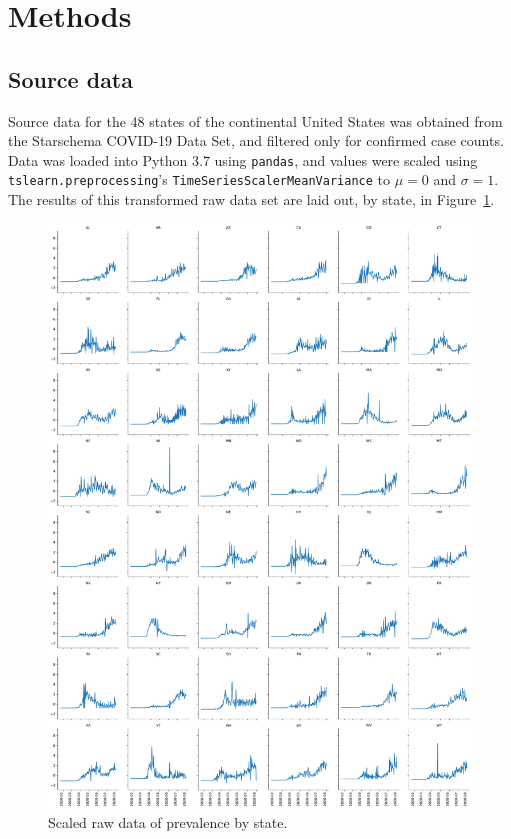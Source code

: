 \documentclass{article}
\begin{document}

\section{Methods} %
\label{sec:methods}

\subsection{Source data} %
\label{sub:source_data}

Source data for the 48 states of the continental United States was obtained from the Starschema COVID-19 Data Set,\cite{foldi_tamas_2020_3969287} and filtered only for confirmed case counts. Data was loaded into Python 3.7 using \texttt{pandas},\cite{mckinney2011pandas} and values were scaled using \texttt{tslearn.preprocessing}'s \texttt{TimeSeriesScalerMeanVariance} to $\mu = 0$ and $\sigma = 1$. The results of this transformed raw data set are laid out, by state, in Figure~\ref{fig:scaled_by_state}. 

\begin{figure}
	\includegraphics[width=\linewidth]{figures/scaled-by-state}
	\centering
	\caption{Scaled raw data of prevalence by state.}
	\label{fig:scaled_by_state}
\end{figure}
\end{document}
